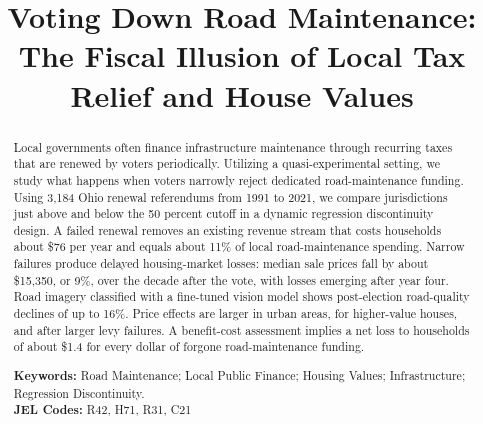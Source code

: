 ﻿\documentclass[12pt]{article}
\begin{document}
\hypersetup{pageanchor=false}
\pagestyle{empty}
\begin{titlepage}
\thispagestyle{empty}
\title{Voting Down Road Maintenance: The Fiscal Illusion of Local Tax Relief and House Values}



\maketitle







\begin{abstract}
\noindent Local governments often finance infrastructure maintenance through recurring taxes that are renewed by voters periodically. Utilizing a quasi-experimental setting, we study what happens when voters narrowly reject dedicated road-maintenance funding. Using 3,184 Ohio renewal referendums from 1991 to 2021, we compare jurisdictions just above and below the 50 percent cutoff in a dynamic regression discontinuity design. A failed renewal removes an existing revenue stream that costs households about \$76 per year and equals about 11\% of local road-maintenance spending. Narrow failures produce delayed housing-market losses: median sale prices fall by about \$15,350, or 9\%, over the decade after the vote, with losses emerging after year four. Road imagery classified with a fine-tuned vision model shows post-election road-quality declines of up to 16\%. Price effects are larger in urban areas, for higher-value houses, and after larger levy failures. A benefit-cost assessment implies a net loss to households of about \$1.4 for every dollar of forgone road-maintenance funding.

\par\vspace{0.5em}
\noindent\textbf{Keywords:} Road Maintenance; Local Public Finance; Housing Values; Infrastructure; Regression Discontinuity.\\ \textbf{JEL Codes:} R42, H71, R31, C21 \\

\end{abstract}
\thispagestyle{empty}
\end{titlepage}
\clearpage
\hypersetup{pageanchor=true}
\pagestyle{plain}
\setcounter{page}{1}

\doublespacing
\end{document}
